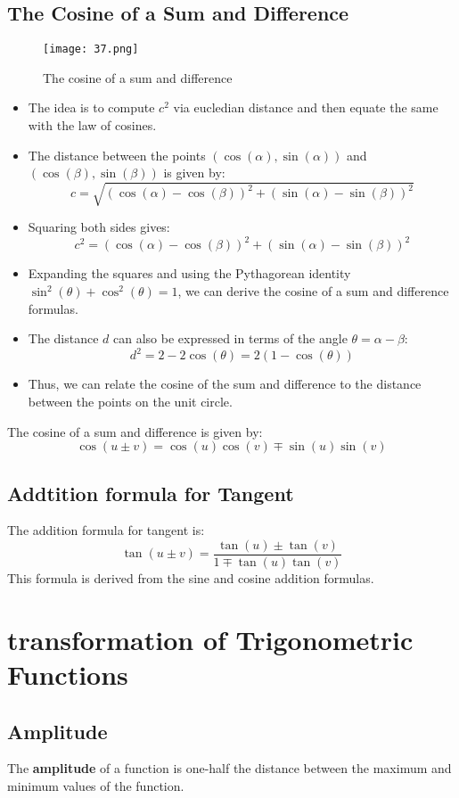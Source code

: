 \subsection{The Cosine of a Sum and Difference}
\begin{figure}
    \centering
    \texttt{[image: 37.png]}
    \caption{The cosine of a sum and difference}
\end{figure}
\begin{itemize}
    \item The idea is to compute $c^2$ via eucledian distance and then equate the same with the law of cosines.
    \item The distance between the points $(\cos(\alpha), \sin(\alpha))$ and $(\cos(\beta), \sin(\beta))$ is given by:
    \[ c = \sqrt{(\cos(\alpha) - \cos(\beta))^2 + (\sin(\alpha) - \sin(\beta))^2} \]
    \item Squaring both sides gives:
    \[ c^2 = (\cos(\alpha) - \cos(\beta))^2 + (\sin(\alpha) - \sin(\beta))^2 \]
    \item Expanding the squares and using the Pythagorean identity $\sin^2(\theta) + \cos^2(\theta) = 1$, we can derive the cosine of a sum and difference formulas.
    \item The distance $d$ can also be expressed in terms of the angle $\theta = \alpha - \beta$:
    \[ d^2 = 2 - 2\cos(\theta) = 2(1 - \cos(\theta)) \]
    \item Thus, we can relate the cosine of the sum and difference to the distance between the points on the unit circle.
\end{itemize}
The cosine of a sum and difference is given by:
\[ \cos( u \pm v) = \cos(u)\cos(v) \mp \sin(u)\sin(v) \]

\subsection{Addtition formula for Tangent}
The addition formula for tangent is:
\[ \tan(u \pm v) = \frac{\tan(u) \pm \tan(v)}{1 \mp \tan(u)\tan(v)} \]
This formula is derived from the sine and cosine addition formulas.

\section{transformation of Trigonometric Functions}
\subsection{Amplitude}
The \textbf{amplitude} of a function is one-half the distance between the maximum and minimum values of the function.

